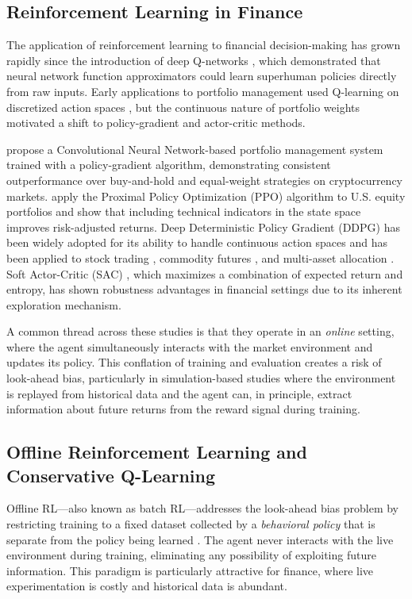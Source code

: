 \subsection{Reinforcement Learning in Finance}
\label{subsec:lit_rl_finance}

The application of reinforcement learning to financial decision-making has grown
rapidly since the introduction of deep Q-networks \citep{Mnih2015}, which demonstrated
that neural network function approximators could learn superhuman policies directly
from raw inputs.
Early applications to portfolio management used Q-learning on discretized action
spaces \citep{Moody1998a}, but the continuous nature of portfolio weights motivated a
shift to policy-gradient and actor-critic methods.

\citet{Jiang2017} propose a Convolutional Neural Network-based portfolio management
system trained with a policy-gradient algorithm, demonstrating consistent
outperformance over buy-and-hold and equal-weight strategies on cryptocurrency markets.
\citet{Ye2020} apply the Proximal Policy Optimization (PPO) algorithm to U.S. equity
portfolios and show that including technical indicators in the state space improves
risk-adjusted returns.
Deep Deterministic Policy Gradient (DDPG) \citep{Lillicrap2015} has been widely
adopted for its ability to handle continuous action spaces and has been applied to
stock trading \citep{Xiong2018}, commodity futures \citep{Liang2018}, and
multi-asset allocation \citep{Soleymani2021}.
Soft Actor-Critic (SAC) \citep{Haarnoja2018}, which maximizes a combination of
expected return and entropy, has shown robustness advantages in financial settings
due to its inherent exploration mechanism.

A common thread across these studies is that they operate in an \emph{online} setting,
where the agent simultaneously interacts with the market environment and updates its
policy.
This conflation of training and evaluation creates a risk of look-ahead bias,
particularly in simulation-based studies where the environment is replayed from
historical data and the agent can, in principle, extract information about future
returns from the reward signal during training.

\subsection{Offline Reinforcement Learning and Conservative Q-Learning}
\label{subsec:lit_offline_rl}

Offline RL---also known as batch RL---addresses the look-ahead bias problem by
restricting training to a fixed dataset collected by a \emph{behavioral policy}
that is separate from the policy being learned \citep{Levine2020}.
The agent never interacts with the live environment during training, eliminating
any possibility of exploiting future information.
This paradigm is particularly attractive for finance, where live experimentation is
costly and historical data is abundant.

